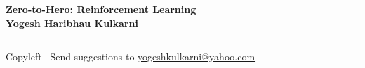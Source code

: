 
\graphicspath{{images/}}

\footnotesize


\begin{center}
\Large{\textbf{Zero-to-Hero: Reinforcement Learning\\ Yogesh Haribhau Kulkarni}}  
\end{center}

\begin{multicols}{2}

\end{multicols}

\rule{\linewidth}{0.25pt}
\scriptsize
Copyleft \textcopyleft\  Send suggestions to 
\href{http://www.yogeshkulkarni.com}{yogeshkulkarni@yahoo.com}


